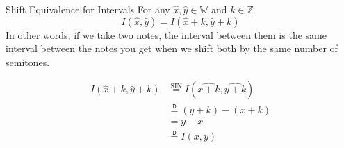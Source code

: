 \documentclass{standalone}
\begin{document}
\begin{theo*}{Shift Equivalence for Intervals}
  For any $ \widehat{x}, \widehat{y} \in \mathbb{W}$ and $k \in \mathbb{Z}$ 
  \[
  I\left( \widehat{x}, \widehat{y}\right) = I\left( \widehat{x}  +  k, \widehat{y}  +  k\right)
  \]
  In other words, if we take two notes, the interval between them is the same interval between the notes you get when we shift both by the same number of semitones.
  \begin{pf}

    \begin{align*}
      I\left( \widehat{x}  + k , \widehat{y}  + k\right) &\stackrel{\text{SIN}}{=} I\left( \widehat{x  + k}, \widehat{y  + k}\right)\\
                                                         &\stackrel{\mathtt{D}}{=} \left( y  + k \right)  -  \left( x  + k \right)\\
                                                         &= y  - x\\
                                                         &\stackrel{\mathtt{D}}{=} I\left(x, y\right)
    \end{align*}
  \end{pf}
\end{theo*}
\end{document}
